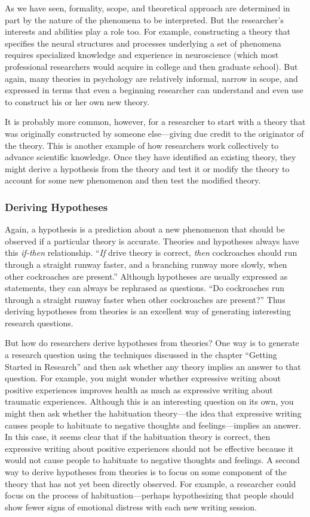 \documentclass[
]{krantz}
\begin{document}
As we have seen, formality, scope, and theoretical approach are determined in part by the nature of the phenomena to be interpreted. But the researcher's interests and abilities play a role too. For example, constructing a theory that specifies the neural structures and processes underlying a set of phenomena requires specialized knowledge and experience in neuroscience (which most professional researchers would acquire in college and then graduate school). But again, many theories in psychology are relatively informal, narrow in scope, and expressed in terms that even a beginning researcher can understand and even use to construct his or her own new theory.

It is probably more common, however, for a researcher to start with a theory that was originally constructed by someone else---giving due credit to the originator of the theory. This is another example of how researchers work collectively to advance scientific knowledge. Once they have identified an existing theory, they might derive a hypothesis from the theory and test it or modify the theory to account for some new phenomenon and then test the modified theory.

\subsubsection*{Deriving Hypotheses}\label{deriving-hypotheses}


Again, a hypothesis is a prediction about a new phenomenon that should be observed if a particular theory is accurate. Theories and hypotheses always have this \emph{if-then} relationship. ``\emph{If} drive theory is correct, \emph{then} cockroaches should run through a straight runway faster, and a branching runway more slowly, when other cockroaches are present.'' Although hypotheses are usually expressed as statements, they can always be rephrased as questions. ``Do cockroaches run through a straight runway faster when other cockroaches are present?'' Thus deriving hypotheses from theories is an excellent way of generating interesting research questions.

But how do researchers derive hypotheses from theories? One way is to generate a research question using the techniques discussed in the chapter ``Getting Started in Research'' and then ask whether any theory implies an answer to that question. For example, you might wonder whether expressive writing about positive experiences improves health as much as expressive writing about traumatic experiences. Although this is an interesting question on its own, you might then ask whether the habituation theory---the idea that expressive writing causes people to habituate to negative thoughts and feelings---implies an answer. In this case, it seems clear that if the habituation theory is correct, then expressive writing about positive experiences should not be effective because it would not cause people to habituate to negative thoughts and feelings. A second way to derive hypotheses from theories is to focus on some component of the theory that has not yet been directly observed. For example, a researcher could focus on the process of habituation---perhaps hypothesizing that people should show fewer signs of emotional distress with each new writing session.
\end{document}
